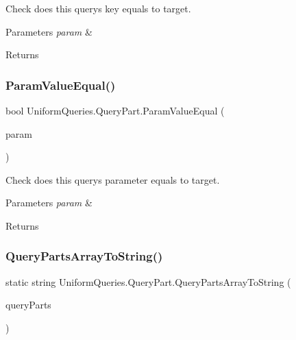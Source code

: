 Check does this query\textquotesingle{}s key equals to target. 


\begin{DoxyParams}{Parameters}
{\em param} & \\
\hline
\end{DoxyParams}
\begin{DoxyReturn}{Returns}

\end{DoxyReturn}
\mbox{\label{struct_uniform_queries_1_1_query_part_a5fb4475a72dcb6882fc860f7c0fcc50e}} 
\subsubsection{\texorpdfstring{Param\+Value\+Equal()}{ParamValueEqual()}}
{\footnotesize\ttfamily bool Uniform\+Queries.\+Query\+Part.\+Param\+Value\+Equal (\begin{DoxyParamCaption}\item[{string}]{param }\end{DoxyParamCaption})}



Check does this query\textquotesingle{}s parameter equals to target. 


\begin{DoxyParams}{Parameters}
{\em param} & \\
\hline
\end{DoxyParams}
\begin{DoxyReturn}{Returns}

\end{DoxyReturn}
\mbox{\label{struct_uniform_queries_1_1_query_part_a053c8ba08ddd1a20d5b50128a524da09}} 
\subsubsection{\texorpdfstring{Query\+Parts\+Array\+To\+String()}{QueryPartsArrayToString()}}
{\footnotesize\ttfamily static string Uniform\+Queries.\+Query\+Part.\+Query\+Parts\+Array\+To\+String (\begin{DoxyParamCaption}\item[{\mbox{\hyperlink{struct_uniform_queries_1_1_query_part}{Query\+Part}} \mbox{[}$\,$\mbox{]}}]{query\+Parts }\end{DoxyParamCaption})\hspace{0.3cm}{\ttfamily [static]}}



